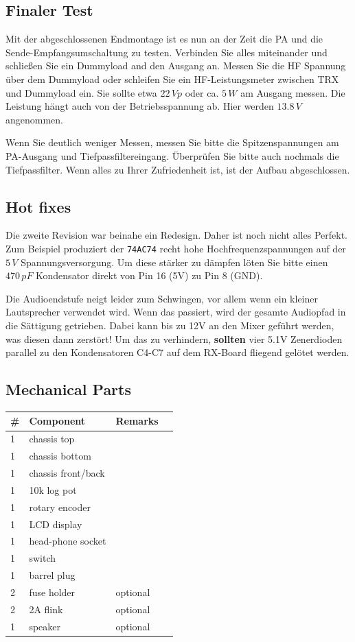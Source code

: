 \documentclass[10pt, a4paper,twoside]{scrartcl}
\begin{document}
\subsection{Finaler Test}
Mit der abgeschlossenen Endmontage ist es nun an der Zeit die PA und die Sende-Empfangsumschaltung zu testen. Verbinden Sie alles miteinander und schließen Sie ein Dummyload and den Ausgang an. Messen Sie die HF Spannung über dem Dummyload oder schleifen Sie ein HF-Leistungsmeter zwischen TRX und Dummyload ein. Sie sollte etwa $22\,Vp$ oder ca. $5\,W$ am Ausgang messen. Die Leistung hängt auch von der Betriebsspannung ab. Hier werden $13.8\,V$ angenommen.

Wenn Sie deutlich weniger Messen, messen Sie bitte die Spitzenspannungen am PA-Ausgang und Tiefpassfiltereingang. Überprüfen Sie bitte auch nochmals die Tiefpassfilter. Wenn alles zu Ihrer Zufriedenheit ist, ist der Aufbau abgeschlossen.

\subsection{Hot fixes}
Die zweite Revision war beinahe ein Redesign. Daher ist noch nicht alles Perfekt. Zum Beispiel produziert der \texttt{74AC74} recht hohe Hochfrequenzspannungen auf der $5\,V$ Spannungsversorgung. Um diese stärker zu dämpfen löten Sie bitte einen $470\,pF$ Kondensator direkt von Pin 16 (5V) zu Pin 8 (GND).

Die Audioendstufe neigt leider zum Schwingen, vor allem wenn ein kleiner Lautsprecher verwendet wird. Wenn das passiert, wird der gesamte Audiopfad in die Sättigung getrieben. Dabei kann bis zu 12V an den Mixer geführt werden, was diesen dann zerstört! Um das zu verhindern, \textbf{sollten} vier 5.1V Zenerdioden parallel zu den Kondensatoren C4-C7 auf dem RX-Board fliegend gelötet werden. 

\clearpage
\subsection{Mechanical Parts}
\begin{longtable}{|l|p{6cm}|l|l|} \hline 
\# & Component & Remarks \\ \hline 
1 & chassis top & \\
1 & chassis bottom & \\
1 & chassis front/back & \\
1 & 10k log pot & \\
1 & rotary encoder & \\
1 & LCD display & \\
1 & head-phone socket & \\
1 & switch & \\
1 & barrel plug & \\
2 & fuse holder & optional \\
2 & 2A flink & optional \\
1 & speaker & optional \\ \hline
\end{longtable}
\end{document}
